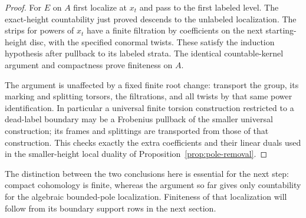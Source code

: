 \begin{proof}
For $E$ on $A$ first localize at $x_t$ and pass to the first labeled
level.  The exact-height countability just proved descends to the
unlabeled localization.  The strips for powers of $x_t$ have a finite
filtration by coefficients on the next starting-height disc, with
the specified conormal twists.  These satisfy the induction
hypothesis after pullback to its labeled strata.  The identical
countable-kernel argument and compactness prove finiteness on $A$.

The argument is unaffected by a fixed finite root change: transport
the group, its marking and splitting torsors, the filtrations, and all
twists by that same power identification.  In particular a universal
finite torsion construction restricted to a dead-label boundary may
be a Frobenius pullback of the smaller universal construction; its
frames and splittings are transported from those of that construction.
This checks exactly the extra coefficients and their linear duals
used in the smaller-height local duality of
Proposition~\ref{prop:pole-removal}.
\end{proof}

The distinction between the two conclusions here is essential for the
next step: compact cohomology is finite, whereas the argument so far
gives only countability for the algebraic bounded-pole localization.
Finiteness of that localization will follow from its boundary support
rows in the next section.
